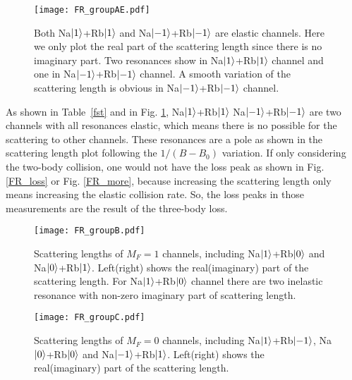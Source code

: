 \begin{figure}[tb]
\begin{center}
\texttt{[image: FR\_groupAE.pdf]}
\end{center}
\caption[Scattering lengths of Na$\ket{1}$+Rb$\ket{1}$ and Na$\ket{-1}$+Rb$\ket{-1}$ elastic channels]{Both Na$\ket{1}$+Rb$\ket{1}$ and Na$\ket{-1}$+Rb$\ket{-1}$ are elastic channels. Here we only plot the real part of the scattering length since there is no imaginary part. Two resonances show in Na$\ket{1}$+Rb$\ket{1}$ channel and one in Na$\ket{-1}$+Rb$\ket{-1}$ channel. A smooth variation of the scattering length is obvious in Na$\ket{-1}$+Rb$\ket{-1}$ channel.}
\label{FR_groupAE}
\end{figure}

As shown in Table~\ref{fst} and in Fig. \ref{FR_groupAE}, Na$\ket{1}$+Rb$\ket{1}$ Na$\ket{-1}$+Rb$\ket{-1}$ are two channels with all resonances elastic, which means there is no possible for the scattering to other channels. These resonances are a pole as shown in the scattering length plot following the $1/(B-B_0)$ variation. If only considering the two-body collision, one would not have the loss peak as shown in Fig. \ref{FR_loss} or Fig. \ref{FR_more}, because increasing the scattering length only means increasing the elastic collision rate. So, the loss peaks in those measurements are the result of the three-body loss.

\begin{figure}[htb]
\begin{center}
\texttt{[image: FR\_groupB.pdf]}
\end{center}
\caption[Scattering lengths of $M_F=1$ channels]{Scattering lengths of $M_F=1$ channels, including Na$\ket{1}$+Rb$\ket{0}$ and Na$\ket{0}$+Rb$\ket{1}$. Left(right) shows the real(imaginary) part of the scattering length. For Na$\ket{1}$+Rb$\ket{0}$ channel there are two inelastic resonance with non-zero imaginary part of scattering length.}
\label{FR_groupB}
\end{figure}
\begin{figure}[htb]
\begin{center}
\texttt{[image: FR\_groupC.pdf]}
\end{center}
\caption[Scattering lengths of $M_F=0$ channels]{Scattering lengths of $M_F=0$ channels, including Na$\ket{1}$+Rb$\ket{-1}$, Na$\ket{0}$+Rb$\ket{0}$ and Na$\ket{-1}$+Rb$\ket{1}$. Left(right) shows the real(imaginary) part of the scattering length.}
\label{FR_groupC}
\end{figure}

